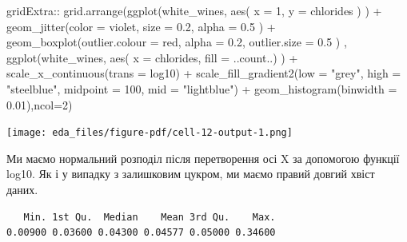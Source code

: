 \documentclass[
  letterpaper,
  DIV=11,
  numbers=noendperiod]{scrreprt}
\newenvironment{Shaded}{\begin{snugshade}}{\end{snugshade}}
\newcommand{\AttributeTok}[1]{\textcolor[rgb]{0.40,0.45,0.13}{#1}}
\newcommand{\DecValTok}[1]{\textcolor[rgb]{0.68,0.00,0.00}{#1}}
\newcommand{\FloatTok}[1]{\textcolor[rgb]{0.68,0.00,0.00}{#1}}
\newcommand{\FunctionTok}[1]{\textcolor[rgb]{0.28,0.35,0.67}{#1}}
\newcommand{\NormalTok}[1]{\textcolor[rgb]{0.00,0.23,0.31}{#1}}
\newcommand{\SpecialCharTok}[1]{\textcolor[rgb]{0.37,0.37,0.37}{#1}}
\newcommand{\StringTok}[1]{\textcolor[rgb]{0.13,0.47,0.30}{#1}}
\begin{document}
\begin{Shaded}
\begin{Highlighting}[]
\NormalTok{gridExtra}\SpecialCharTok{::} \FunctionTok{grid.arrange}\NormalTok{(}\FunctionTok{ggplot}\NormalTok{(white\_wines, }\FunctionTok{aes}\NormalTok{( }\AttributeTok{x =} \DecValTok{1}\NormalTok{, }\AttributeTok{y =}\NormalTok{ chlorides ) ) }\SpecialCharTok{+} 
               \FunctionTok{geom\_jitter}\NormalTok{(}\AttributeTok{color =} \StringTok{\textquotesingle{}violet\textquotesingle{}}\NormalTok{, }\AttributeTok{size =} \FloatTok{0.2}\NormalTok{, }\AttributeTok{alpha =} \FloatTok{0.5}\NormalTok{ ) }\SpecialCharTok{+}
               \FunctionTok{geom\_boxplot}\NormalTok{(}\AttributeTok{outlier.colour =} \StringTok{\textquotesingle{}red\textquotesingle{}}\NormalTok{, }\AttributeTok{alpha =} \FloatTok{0.2}\NormalTok{, }\AttributeTok{outlier.size =} \FloatTok{0.5}\NormalTok{ ) ,}
             \FunctionTok{ggplot}\NormalTok{(white\_wines, }\FunctionTok{aes}\NormalTok{( }\AttributeTok{x   =}\NormalTok{ chlorides, }\AttributeTok{fill =}\NormalTok{ ..count..) ) }\SpecialCharTok{+}
               \FunctionTok{scale\_x\_continuous}\NormalTok{(}\AttributeTok{trans =} \StringTok{\textquotesingle{}log10\textquotesingle{}}\NormalTok{) }\SpecialCharTok{+}
               \FunctionTok{scale\_fill\_gradient2}\NormalTok{(}\AttributeTok{low =} \StringTok{"grey"}\NormalTok{, }\AttributeTok{high =} \StringTok{"steelblue"}\NormalTok{, }\AttributeTok{midpoint =} \DecValTok{100}\NormalTok{, }\AttributeTok{mid =} \StringTok{"lightblue"}\NormalTok{) }\SpecialCharTok{+}
                   \FunctionTok{geom\_histogram}\NormalTok{(}\AttributeTok{binwidth =} \FloatTok{0.01}\NormalTok{),}\AttributeTok{ncol=}\DecValTok{2}\NormalTok{)}
\end{Highlighting}
\end{Shaded}

\texttt{[image: eda\_files/figure-pdf/cell-12-output-1.png]}

Ми маємо нормальний розподіл після перетворення осі X за допомогою
функції log10. Як і у випадку з залишковим цукром, ми маємо правий
довгий хвіст даних.

\begin{Shaded}
\end{Shaded}

\begin{verbatim}
   Min. 1st Qu.  Median    Mean 3rd Qu.    Max. 
0.00900 0.03600 0.04300 0.04577 0.05000 0.34600 
\end{verbatim}
\end{document}
